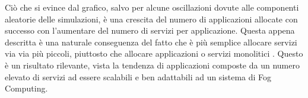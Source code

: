 Ciò che si evince dal grafico, salvo per alcune oscillazioni dovute alle componenti aleatorie delle simulazioni, è una crescita del numero di applicazioni allocate con successo con l'aumentare del numero di servizi per applicazione. Questa appena descritta è una naturale conseguenza del fatto che è più semplice allocare servizi via via più piccoli, piuttosto che allocare applicazioni o servizi monolitici \cite{microservices_app_placement}. Questo è un risultato rilevante, vista la tendenza di applicazioni composte da un numero elevato di servizi ad essere scalabili e ben adattabili ad un sistema di Fog Computing.




